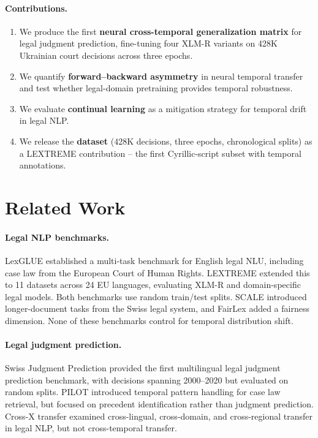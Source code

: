 \documentclass[11pt]{article}
\begin{document}
\paragraph{Contributions.}
\begin{enumerate}[nosep]
  \item We produce the first \textbf{neural cross-temporal generalization matrix} for legal judgment prediction, fine-tuning four XLM-R variants on 428K Ukrainian court decisions across three epochs.
  \item We quantify \textbf{forward--backward asymmetry} in neural temporal transfer and test whether legal-domain pretraining provides temporal robustness.
  \item We evaluate \textbf{continual learning} as a mitigation strategy for temporal drift in legal NLP.
  \item We release the \textbf{dataset} (428K decisions, three epochs, chronological splits) as a LEXTREME contribution -- the first Cyrillic-script subset with temporal annotations.
\end{enumerate}

\section{Related Work}

\paragraph{Legal NLP benchmarks.}
LexGLUE \citep{chalkidis2021lexglue} established a multi-task benchmark for English legal NLU, including case law from the European Court of Human Rights. LEXTREME \citep{niklaus2023lextreme} extended this to 11 datasets across 24 EU languages, evaluating XLM-R and domain-specific legal models. Both benchmarks use random train/test splits. SCALE \citep{niklaus2023scale} introduced longer-document tasks from the Swiss legal system, and FairLex \citep{chalkidis2022fairlex} added a fairness dimension. None of these benchmarks control for temporal distribution shift.

\paragraph{Legal judgment prediction.}
Swiss Judgment Prediction \citep{niklaus2021swiss} provided the first multilingual legal judgment prediction benchmark, with decisions spanning 2000--2020 but evaluated on random splits. PILOT \citep{cao2024pilot} introduced temporal pattern handling for case law retrieval, but focused on precedent identification rather than judgment prediction. Cross-X transfer \citep{niklaus2022cross} examined cross-lingual, cross-domain, and cross-regional transfer in legal NLP, but not cross-temporal transfer.
\end{document}
